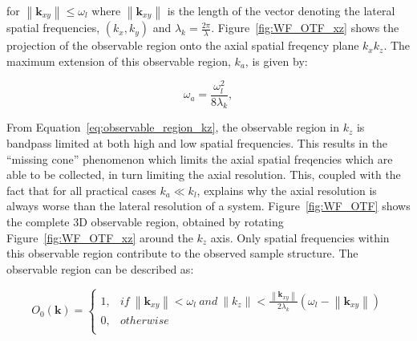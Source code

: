 for $\left\|\textbf{k}_{xy}\right\| \le \omega_{l}$ where 
$\left\|\textbf{k}_{xy}\right\|$ is the length of the vector denoting the 
lateral spatial frequencies, $(k_{x},k_{y})$ and $\lambda_{k} = 
\frac{2\pi}{\lambda}$\cite{frieden1967optical}. Figure~\ref{fig:WF_OTF_xz} shows 
the projection of the observable region onto the axial spatial freqency plane 
$k_{x}k_{z}$. The maximum extension of this observable region, $k_{a}$, is given 
by:

\begin{equation}\label{eq:axial_observable_max_k}
\omega_{a} = \frac{\omega_{l}^{2}}{8\lambda_{k}},
\end{equation}

From Equation~\ref{eq:observable_region_kz}, the observable
region in $k_{z}$ is bandpass limited at both high and low spatial frequencies.
This results in the ``missing cone'' phenomenon which limits the axial spatial 
freqencies which are able to be collected, in turn limiting the axial 
resolution\cite{behan2009three,arnison20023d}. This, coupled with the fact that
for all practical cases $k_{a} \ll k_{l}$, explains why the axial resolution is
always worse than the lateral resolution of a system. Figure~\ref{fig:WF_OTF} 
shows the complete 3D observable region, obtained by rotating 
Figure~\ref{fig:WF_OTF_xz} around the $k_{z}$ axis. Only spatial frequencies
within this observable region contribute to the observed sample structure.
The observable region can be described as:

\begin{equation}\label{eq:observable region}
O_{0}(\textbf{k}) = 
\begin{cases}
1, & if~ \left\|\textbf{k}_{xy}\right\| < \omega_{l} ~and~ \left\|k_{z}\right\| < \frac{\left\|\textbf{k}_{xy}\right\|}{2\lambda_{k}}(\omega_{l} - \left\|\textbf{k}_{xy}\right\|)\\
0, & otherwise\\
\end{cases}
\end{equation}

